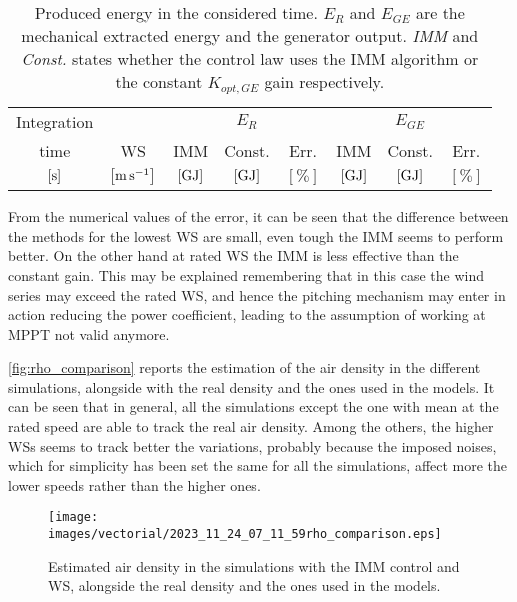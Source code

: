 \begin{table}[htb]
  \caption{Produced energy in the considered time. $E_R$ and $E_{GE}$ are the mechanical extracted energy and the generator output. \textit{IMM} and \textit{Const.} states whether the control law uses the IMM algorithm or the constant $K_{opt,GE}$ gain respectively.}
  \centering
  \begin{tabular}{cc|ccc|ccc}
    \toprule
    Integration & & \multicolumn{3}{c|}{$E_R$} & \multicolumn{3}{c}{$E_{GE}$}\\
    time & WS & IMM & Const. & Err. & IMM & Const. & Err.\\
    $\left[\si{\second}\right]$ & $\left[\si{\meter\per\second}\right]$ & $\left[\si{\giga\joule}\right]$ &   $\left[\si{\giga\joule}\right]$ & $\left[\%\right]$& $\left[\si{\giga\joule}\right]$ &   $\left[\si{\giga\joule}\right]$ & $\left[\%\right]$ \\
    \midrule
    
  \end{tabular}
  \label{tab:comparison_IMM}
\end{table}

From the numerical values of the error, it can be seen that the difference between the methods for the lowest WS are small, even tough the IMM seems to perform better. On the other hand at rated WS the IMM is less effective than the constant gain. This may be explained remembering that in this case the wind series may exceed the rated WS, and hence the pitching mechanism may enter in action reducing the power coefficient, leading to the assumption of working at MPPT not valid anymore.

\autoref{fig:rho_comparison} reports the estimation of the air density in the different simulations, alongside with the real density and the ones used in the models. It can be seen that in general, all the simulations except the one with mean at the rated speed are able to track the real air density. Among the others, the higher WSs seems to track better the variations, probably because the imposed noises, which for simplicity has been set the same for all the simulations, affect more the lower speeds rather than the higher ones.
\begin{figure}[htb]
  \centering
  \texttt{[image: images/vectorial/2023\_11\_24\_07\_11\_59rho\_comparison.eps]}
  \caption{Estimated air density in the simulations with the IMM control and WS, alongside the real density and the ones used in the models.}
  \label{fig:rho_comparison}
\end{figure}

